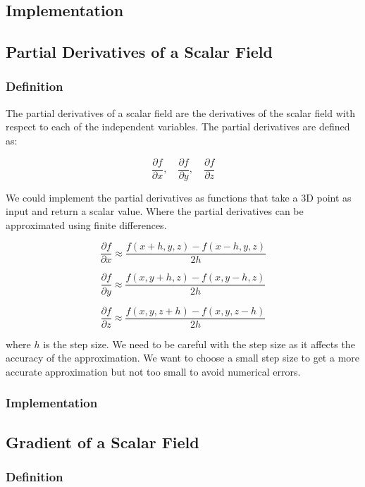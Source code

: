 \documentclass[12pt]{article}
\begin{document}
\subsection{Implementation}

\subsection{Partial Derivatives of a Scalar Field}

\subsubsection{Definition}

The partial derivatives of a scalar field are the derivatives of the scalar field with respect to each of the independent variables. The partial derivatives are defined as:

\[
    \frac{\partial f}{\partial x}, \quad \frac{\partial f}{\partial y}, \quad \frac{\partial f}{\partial z}
\]

We could implement the partial derivatives as functions that take a 3D point as input and return a scalar value.
Where the partial derivatives can be approximated using finite differences.

\[
    \frac{\partial f}{\partial x} \approx \frac{f(x + h, y, z) - f(x - h, y, z)}{2h}
\]

\[
    \frac{\partial f}{\partial y} \approx \frac{f(x, y + h, z) - f(x, y - h, z)}{2h}
\]

\[
    \frac{\partial f}{\partial z} \approx \frac{f(x, y, z + h) - f(x, y, z - h)}{2h}
\]

where \(h\) is the step size. We need to be careful with the step size as it affects the accuracy of the approximation. We want to choose a small step size to get a more accurate approximation but not too small to avoid numerical errors.

\subsubsection{Implementation}

\subsection{Gradient of a Scalar Field}

\subsubsection{Definition}
\end{document}
